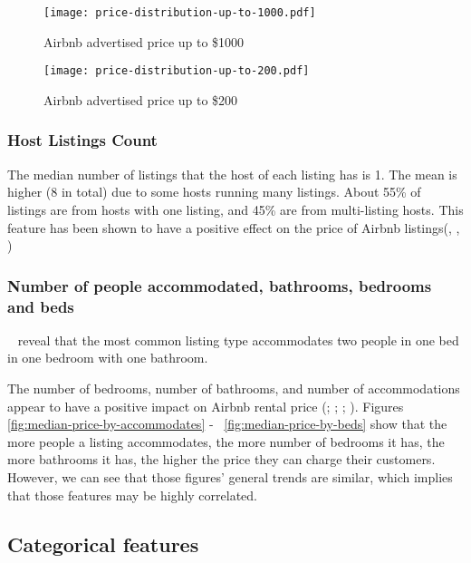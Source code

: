 \begin{figure}[H] \centering
    \texttt{[image: price-distribution-up-to-1000.pdf]}
        \caption{Airbnb advertised price up to \$1000}
        \label{fig:price-distribution-1000}
\end{figure}

\begin{figure}[H] \centering
    \texttt{[image: price-distribution-up-to-200.pdf]}
        \caption{Airbnb advertised price up to \$200}
        \label{fig:price-distribution-200}
\end{figure}

\subsubsection*{Host Listings Count}

The median number of listings that the host of each listing has is 1. The mean
is higher (8 in total) due to some hosts running many listings. About 55\% of
listings are from hosts with one listing, and 45\% are from multi-listing hosts.
This feature has been shown to have a positive effect on the price of Airbnb
listings(\cite{chen2017consumer}, \cite{ert2016trust}, \cite{wang2017price})

\subsubsection*{Number of people accommodated, bathrooms, bedrooms and beds}

~
  reveal that the most common listing type accommodates two people in one bed
  in one
bedroom with one bathroom.

The number of bedrooms, number of bathrooms, and number of accommodations appear
to have a positive impact on Airbnb rental price (\cite{ert2016trust};
\cite{chen2017consumer}; \cite{wang2017price}; \cite{gibbs2018use}). Figures
\ref{fig:median-price-by-accommodates} - ~\ref{fig:median-price-by-beds} show that the more people a listing
accommodates, the more number of bedrooms it has, the more bathrooms it has, the
higher the price they can charge their customers. However, we can see that those
figures' general trends are similar, which implies that those features may be
highly correlated.

\subsection{Categorical features}
\label{sec:categorical_features}

